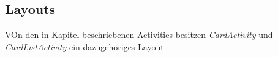 \subsection{Layouts} 
VOn den in Kapitel  beschriebenen Activities besitzen \textit{CardActivity} und \textit{CardListActivity} ein dazugehöriges Layout.